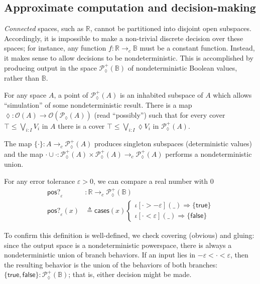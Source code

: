 \documentclass[conference]{IEEEtran}
\newcommand{\PLower}{\mathcal{P}_\lozenge}
\newcommand{\cto}{\to_c}
\newcommand{\R}{\mathbb{R}}
\newcommand{\Open}[1]{\mathcal{O}({#1})}
\newcommand{\bool}{\mathbb{B}}
\newcommand{\wildcard}{\_}
\newcommand{\oinclf}[1]{\iota[{#1}]}
\newcommand{\oincl}[2]{\oinclf{#1} \left({#2}\right)}
\newcommand{\Branch}{\Rightarrow}
\begin{document}
\subsection{Approximate computation and decision-making}

\emph{Connected} spaces, such as $\R$, cannot be partitioned into disjoint open subspaces. Accordingly, it is impossible to make a non-trivial discrete decision over these spaces; for instance, any function $f : \R \cto \bool$ must be a constant function. Instead, it makes sense to allow decisions to be nondeterministic. This is accomplished by producing output in the space $\PLower^+(\bool)$ of nondeterministic Boolean values, rather than $\bool$.

For any space $A$, a point of $\PLower^+(A)$ is an inhabited subspace of $A$ which allows ``simulation'' of some nondeterministic result. There is a map $\lozenge : \Open{A} \to \Open{\PLower(A)}$ (read ``possibly'') such that for every cover $\top \le \bigvee_{i : I} V_i$ in $A$ there is a cover $\top \le \bigvee_{i : I} \lozenge V_i$ in $\PLower^+(A)$. 

The map $\{ \cdot \} : A \cto \PLower^+(A)$ produces singleton subspaces (deterministic values) and the map $\cdot \cup \cdot : \PLower^+(A) \times \PLower^+(A) \cto \PLower^+(A)$ performs a nondeterministic union.

For any error tolerance $\varepsilon > 0$, we can compare a real number with 0
\begin{align*}
\mathsf{pos?}_\varepsilon &: \R \cto \PLower^+(\bool)
\\ \mathsf{pos?}_\varepsilon(x) &\triangleq \mathsf{cases}(x)
\begin{cases}
\oincl{\cdot > - \varepsilon}{\wildcard} \Branch \{ \mathsf{true} \}
\\ \oincl{\cdot < \varepsilon}{\wildcard} \Branch \{ \mathsf{false} \}
\end{cases}
\end{align*}

To confirm this definition is well-defined, we check covering (obvious) and gluing: since the output space is a nondeterministic powerspace, there is always a nondeterministic union of branch behaviors. If an input lies in $- \varepsilon < \cdot < \varepsilon$, then the resulting behavior is the union of the behaviors of both branches: $\{ \mathsf{true}, \mathsf{false} \} : \PLower^+(\bool)$; that is, either decision might be made.
\end{document}

